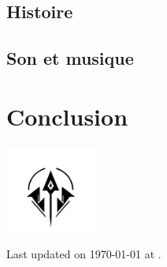 \documentclass[12pt]{article}
\begin{document}
\subsection{Histoire}


\subsection{Son et musique}



\newpage
\section{Conclusion}


\centering
\vspace*{1.8cm}
\includegraphics[width=3cm]{0.format/logo.png}

\vspace*{1cm}
Last updated on \today{} at \currenttime.
\end{document}
